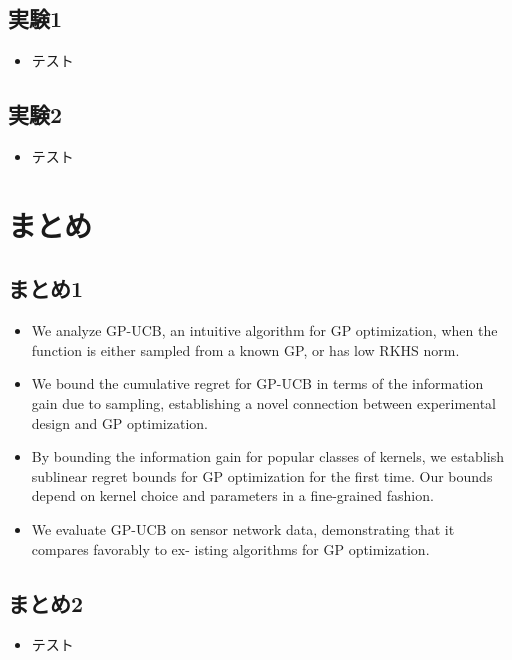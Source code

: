\documentclass[dvipdfmx, 10.5pt]{beamer}
\begin{document}
\subsection{実験1}

\begin{frame}{\insertsubsection}
	\begin{itemize}
		\item テスト
	\end{itemize}

\end{frame}


\subsection{実験2}
\begin{frame}{\insertsubsection}
	\begin{itemize}
		\item テスト
	\end{itemize}

\end{frame}

\section{まとめ}


\subsection{まとめ1}

\begin{frame}{\insertsubsection}
	\begin{itemize}
		\item We analyze GP-UCB, an intuitive algorithm for GP optimization, when the function is either sampled from a known GP, or has low RKHS norm.
		\item We bound the cumulative regret for GP-UCB in terms of the information gain due to sampling, establishing a novel connection between experimental design and GP optimization.
		\item By bounding the information gain for popular classes of kernels, we establish sublinear regret bounds for GP optimization for the first time. Our bounds depend on kernel choice and parameters in a fine-grained fashion.
		\item We evaluate GP-UCB on sensor network data, demonstrating that it compares favorably to ex- isting algorithms for GP optimization.
	\end{itemize}

\end{frame}


\subsection{まとめ2}
\begin{frame}{\insertsubsection}
	\begin{itemize}
		\item テスト
	\end{itemize}

\end{frame}

\end{document}
